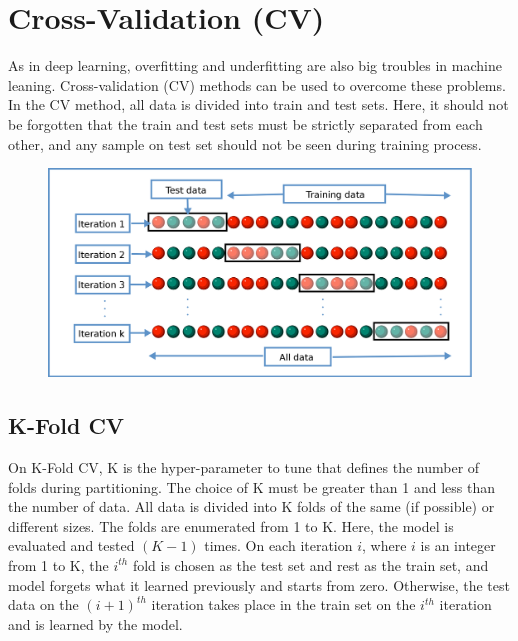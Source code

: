 \section{Cross-Validation (CV)}

As in deep learning, overfitting and underfitting are also big troubles in machine leaning. Cross-validation (CV) methods can be used to overcome these problems. In the CV method, all data is divided into train and test sets. Here, it should not be forgotten that the train and test sets must be strictly separated from each other, and any sample on test set should not be seen during training process.

\begin{figure}[h]
	\centering
	\includegraphics[width=.8\linewidth]{fig/k_fold_cv.png}
	\vspace*{2mm}
	\label{k_fold_cv}
\end{figure}

\subsection{K-Fold CV}

On K-Fold CV, K is the hyper-parameter to tune that defines the number of folds during partitioning. The choice of K must be greater than 1 and less than the number of data. All data is divided into K folds of the same (if possible) or different sizes. The folds are enumerated from 1 to K. Here, the model is evaluated and tested $(K-1)$ times. On each iteration $i$, where $i$ is an integer from 1 to K, the $i^{th}$ fold is chosen as the test set and rest as the train set, and model forgets what it learned previously and starts from zero. Otherwise, the test data on the $(i+1)^{th}$ iteration takes place in the train set on the $i^{th}$ iteration and is learned by the model.

